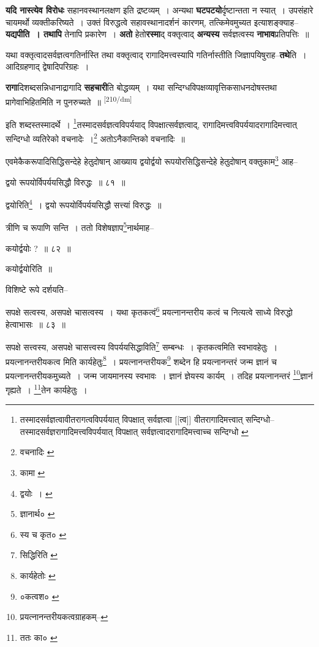 \documentclass[article,12pt,a4paper]{memoir}
\begin{document}
	  \pstart \textbf{यदि नास्त्येव विरोधः} सहानवस्थानलक्षण इति द्रष्टव्यम् । अन्यथा \textbf{घटपटयो}र्दृष्टान्तता न स्यात् । उपसंहारे चायमर्थो व्यक्तीकरिष्यते । उक्तं विरुद्धत्वे सहावस्थानादर्शनं कारणम्, तत्किमेवमुच्यत इत्याशङ्क्याह--\textbf{यद्यपीति । तथापि} तेनापि प्रकारेण । \textbf{अतो} हेतो\textbf{रस्मा}द् वक्तृत्वाद् \textbf{अन्यस्य} सर्वज्ञत्वस्य \textbf{नाभाव}प्रतिपत्तिः ॥
	\pend
      

	  \pstart यथा वक्तृत्वादसर्वज्ञत्वगतिर्नास्ति तथा वक्तृत्वाद् रागादिमत्त्वस्यापि गतिर्नास्तीति जिज्ञापयिषुराह--\textbf{तथे}ति । आदिग्रहणाद् द्वेषादिपरिग्रहः ।
	\pend
      

	  \pstart \textbf{रागा}दिशब्दसन्निधानाद्रागादि \textbf{सहचारी}ति बोद्धव्यम् । यथा सन्दिग्धविपक्षव्यावृत्तिकसाधनदोषस्तथा प्रागेवाभिहितमिति न पुनरुच्यते ॥
	\pend
      \leavevmode\textsuperscript{\rmlatinfont\tiny [210/dm]}

	  \pstart इति शब्दस्तस्मादर्थे । \footnote{तस्मादसर्वज्ञत्वावीतरागत्वविपर्ययात् विपक्षात् सर्वज्ञत्वा [[त्व]] वीतरागादिमत्त्वात् सन्दिग्धो--\cite{dp-msB} तस्मादसर्वज्ञरागादिमत्त्वविपर्ययात् विपक्षात् सर्वज्ञत्वादरागादिमत्त्वाच्च सन्दिग्धो \cite{dp-msC}}तस्मादसर्वज्ञत्वविपर्ययाद् विपक्षात्सर्वज्ञत्वाद्, रागादिमत्त्वविपर्ययादरागादिमत्त्वात् सन्दिग्धो व्यतिरेको वचनादेः ।\footnote{वचनादिः \cite{dp-msC}} अतोऽनैकान्तिको वचनादिः ॥
	\pend
       

	  \pstart एवमेकैकरूपादिसिद्धिसन्देहे हेतुदोषान् आख्याय द्वयोर्द्वयो रूपयोरसिद्धिसन्देहे हेतुदोषान् वक्तुकाम\footnote{कामा \cite{dp-msC}} आह--
	\pend
       

	  \pstart द्वयो रूपयोर्विपर्ययसिद्धौ विरुद्धः ॥ ८१ ॥
	\pend
       

	  \pstart द्वयोरिति\footnote{द्वयोः । \cite{dp-msD}} । द्वयो रूपयोर्विपर्ययसिद्धौ सत्त्यां विरुद्धः ॥
	\pend
       

	  \pstart त्रीणि च रूपाणि सन्ति । ततो विशेषज्ञाप\footnote{ज्ञानार्थ० \cite{dp-msC}}नार्थमाह--
	\pend
       

	  \pstart कयोर्द्वयोः ? ॥ ८२ ॥
	\pend
       

	  \pstart कयोर्द्वयोरिति ॥
	\pend
       

	  \pstart विशिष्टे रूपे दर्शयति--
	\pend
       

	  \pstart सपक्षे सत्वस्य, असपक्षे चासत्वस्य । यथा कृतकत्वं\footnote{स्य च कृत० \cite{dp-msC}} प्रयत्नानन्तरीय कत्वं च नित्यत्वे साध्ये विरुद्धो हेत्वाभासः ॥ ८३ ॥
	\pend
       

	  \pstart सपक्षे सत्त्वस्य, असपक्षे चासत्त्वस्य विपर्ययसिद्धाविति\footnote{सिद्धिरिति \cite{dp-msC}} सम्बन्धः । कृतकत्वमिति स्वभावहेतुः । प्रयत्नानन्तरीयकत्व मिति कार्यहेतुः\footnote{कार्यहेतोः \cite{dp-edH}} । प्रयत्नानन्तरीयक\footnote{०कत्वश० \cite{dp-msC}} शब्देन हि प्रयत्नानन्तरं जन्म ज्ञानं च प्रयत्नानन्तरीयकमुच्यते । जन्म जायमानस्य स्वभावः । ज्ञानं ज्ञेयस्य कार्यम् । तदिह प्रयत्नानन्तरं \footnote{प्रयत्नानन्तरीयकत्वग्राहकम्--\cite{dp-msD-n}}ज्ञानं गृह्यते । \footnote{ततः का० \cite{dp-msC} \cite{dp-msD}}तेन कार्यहेतुः ।
	\pend
      
\end{document}
